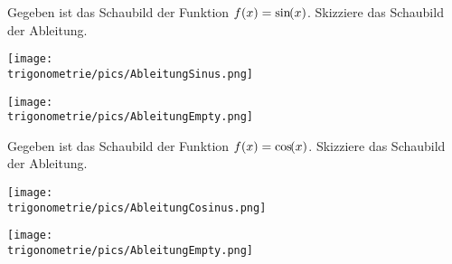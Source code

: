 Gegeben ist das Schaubild der Funktion \(f(x)=\sinn{x}\). Skizziere das Schaubild der Ableitung.

\begin{minipage}{\textwidth}
	\texttt{[image: \\trigonometrie/pics/AbleitungSinus.png]}
\end{minipage}%

\medskip

\begin{minipage}{\textwidth}
	\texttt{[image: \\trigonometrie/pics/AbleitungEmpty.png]}
\end{minipage}%

\vspace{\baselineskip}

Gegeben ist das Schaubild der Funktion \(f(x)=\coss{x}\). Skizziere das Schaubild der Ableitung.

\begin{minipage}{\textwidth}
	\texttt{[image: \\trigonometrie/pics/AbleitungCosinus.png]}
\end{minipage}%

\medskip

\begin{minipage}{\textwidth}
	\texttt{[image: \\trigonometrie/pics/AbleitungEmpty.png]}
\end{minipage}%

\newpage
\iftoggle{qrcode}{\setlength{\qrheight}{2.5cm}}{\setlength{\qrheight}{0cm}}%
\newlength{\trigoAbl}%
\setlength{\trigoAbl}{\linewidth-\qrheight}%
\begin{minipage}{\linewidth}
    \iftoggle{qrcode}{\adjustbox{valign=t, padding =0ex 0ex 0ex 0ex}{\begin{minipage}{\qrheight}%
                \href{https://www.geogebra.org/m/uv4dpht4}{\texttt{[image: \\trigonometrie/pics/TrigAbleitungQR.png]}}%
    \end{minipage}}}{}%
\end{minipage}%

